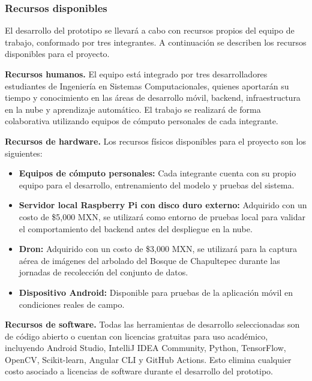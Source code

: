 \subsubsection{Recursos disponibles}

El desarrollo del prototipo se llevará a cabo con recursos propios del
equipo de trabajo, conformado por tres integrantes. A continuación se
describen los recursos disponibles para el proyecto.

\textbf{Recursos humanos.} El equipo está integrado por tres
desarrolladores estudiantes de Ingeniería en Sistemas Computacionales,
quienes aportarán su tiempo y conocimiento en las áreas de desarrollo
móvil, backend, infraestructura en la nube y aprendizaje automático.
El trabajo se realizará de forma colaborativa utilizando equipos de
cómputo personales de cada integrante.

\textbf{Recursos de hardware.} Los recursos físicos disponibles para
el proyecto son los siguientes:

\begin{itemize}
    \item \textbf{Equipos de cómputo personales:} Cada integrante
    cuenta con su propio equipo para el desarrollo, entrenamiento del
    modelo y pruebas del sistema.
    \item \textbf{Servidor local Raspberry Pi con disco duro externo:}
    Adquirido con un costo de \$5,000 MXN, se utilizará como entorno
    de pruebas local para validar el comportamiento del backend antes
    del despliegue en la nube.
    \item \textbf{Dron:} Adquirido con un costo de \$3,000 MXN, se
    utilizará para la captura aérea de imágenes del arbolado del
    Bosque de Chapultepec durante las jornadas de recolección del
    conjunto de datos.
    \item \textbf{Dispositivo Android:} Disponible para pruebas de
    la aplicación móvil en condiciones reales de campo.
\end{itemize}

\textbf{Recursos de software.} Todas las herramientas de desarrollo
seleccionadas son de código abierto o cuentan con licencias gratuitas
para uso académico, incluyendo Android Studio, IntelliJ IDEA Community,
Python, TensorFlow, OpenCV, Scikit-learn, Angular CLI y GitHub Actions.
Esto elimina cualquier costo asociado a licencias de software durante
el desarrollo del prototipo.
